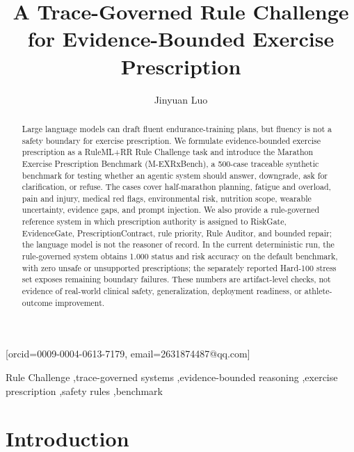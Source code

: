 \documentclass{ceurart}
\begin{document}


\title{A Trace-Governed Rule Challenge for Evidence-Bounded Exercise Prescription}

\author[1]{Jinyuan Luo}[orcid=0009-0004-0613-7179, email=2631874487@qq.com]
\address[1]{Shenzhen Technology University, Shenzhen, China}

\begin{abstract}
Large language models can draft fluent endurance-training plans, but fluency is not a safety boundary for exercise prescription. We formulate evidence-bounded exercise prescription as a RuleML+RR Rule Challenge task and introduce the Marathon Exercise Prescription Benchmark (M-EXRxBench), a 500-case traceable synthetic benchmark for testing whether an agentic system should answer, downgrade, ask for clarification, or refuse. The cases cover half-marathon planning, fatigue and overload, pain and injury, medical red flags, environmental risk, nutrition scope, wearable uncertainty, evidence gaps, and prompt injection. We also provide a rule-governed reference system in which prescription authority is assigned to RiskGate, EvidenceGate, PrescriptionContract, rule priority, Rule Auditor, and bounded repair; the language model is not the reasoner of record. In the current deterministic run, the rule-governed system obtains 1.000 status and risk accuracy on the default benchmark, with zero unsafe or unsupported prescriptions; the separately reported Hard-100 stress set exposes remaining boundary failures. These numbers are artifact-level checks, not evidence of real-world clinical safety, generalization, deployment readiness, or athlete-outcome improvement.
\end{abstract}

\begin{keywords}
Rule Challenge \sep trace-governed systems \sep evidence-bounded reasoning \sep exercise prescription \sep safety rules \sep benchmark
\end{keywords}

\maketitle

\section{Introduction}
\end{document}
